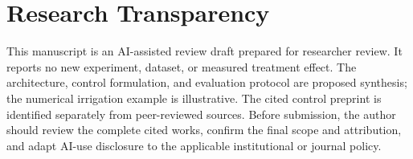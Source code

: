 \documentclass[11pt,a4paper]{article}
\begin{document}
\section*{Research Transparency}

\label{sec:transparency}

This manuscript is an AI-assisted review draft prepared for researcher review. It reports no new experiment, dataset, or measured treatment effect. The architecture, control formulation, and evaluation protocol are proposed synthesis; the numerical irrigation example is illustrative. The cited control preprint is identified separately from peer-reviewed sources. Before submission, the author should review the complete cited works, confirm the final scope and attribution, and adapt AI-use disclosure to the applicable institutional or journal policy.




\end{document}
